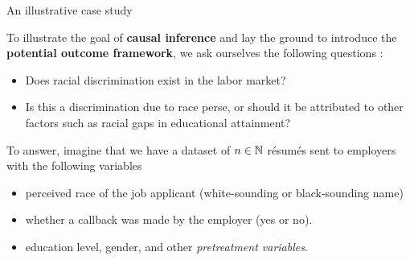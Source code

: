 \documentclass[aspectratio=169]{beamer}
\begin{document}
\begin{frame}{An illustrative case study}

To illustrate the goal of \textbf{causal inference} and lay the ground to introduce the \textbf{ potential outcome framework}, we ask ourselves the following questions%
:
\vspace{0.2cm}

\begin{itemize}
    \item Does racial discrimination exist in the labor market?
    \item Is this a discrimination due to race perse, or should it be attributed to other factors such as racial gaps in educational attainment?
\end{itemize}
\vspace{0.3cm}

To answer, imagine that we have a dataset of $n\in\mathbb{N}$ résumés sent to employers with the following variables
\begin{itemize}
    \item[$\bullet$] perceived race of the job applicant (white-sounding or black-sounding name)
    \item[$\bullet$] whether a callback was made by the employer (yes or no).
    \item[$\bullet$] education level, gender, and other \textit{pretreatment variables}.
\end{itemize}


\end{frame}
\end{document}
